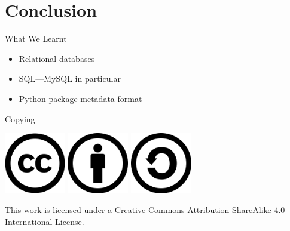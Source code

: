 \documentclass[pdf]{beamer}
\begin{document}
\section{Conclusion}
\frame{\tableofcontents[currentsection]}
\begin{frame}{What We Learnt}\Large
  \begin{itemize}\Large
    \item Relational databases
    \item SQL---MySQL in particular
    \item Python package metadata format
  \end{itemize}
\end{frame}

\begin{frame}{Copying}\Large
  \begin{center}
    \includegraphics[width=0.2\textwidth]{CC.png}
    \includegraphics[width=0.2\textwidth]{BY.png}
    \includegraphics[width=0.2\textwidth]{SA.png}
  \end{center}

  This work is licensed under a
  \href{https://creativecommons.org/licenses/by-sa/4.0/}{Creative Commons
  Attribution-ShareAlike 4.0 International License}.
\end{frame}
\end{document}
